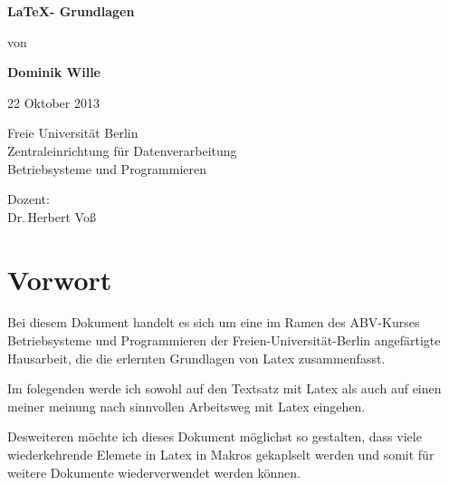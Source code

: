 

\newcommand{\myPackage}[1]{%
  \textit{#1}-Paket%
}

\newcommand{\myFormat}[1]{%
  \textit{#1}%
}

\newcommand{\myPath}[1]{%
  \textit{#1}%
}

\newcommand{\myTitle}{\LaTeX - Grundlagen}
\newcommand{\myAuthor}{Dominik Wille}
\newcommand{\myDate}{22 Oktober 2013}


\begin{titlepage}
  \begin{center}
    \vspace{5cm}
    \huge\bfseries
    \myTitle
    \vspace{1cm}

    \large\normalfont von

    \bigskip
    \textbf{\myAuthor}

    \myDate

    \vspace{2cm}
  \end{center}
  \vfill
  \enlargethispage{2cm}
  \parbox[t]{0.45\textwidth}{%
    Freie Universität Berlin\\
    Zentraleinrichtung für Datenverarbeitung\\
    Betriebsysteme und Programmieren
  }
  \parbox[t]{0.45\textwidth}{\raggedleft%
    Dozent: \\
    Dr.\,Herbert Voß\\
  }
\end{titlepage}
\section{Vorwort}
Bei diesem Dokument handelt es sich um eine im Ramen des ABV-Kurses Betriebsysteme und Programmieren der
Freien-Universität-Berlin angefärtigte Hausarbeit, die die erlernten Grundlagen von Latex zusammenfasst.

Im folegenden werde ich sowohl auf den Textsatz mit Latex als auch auf einen meiner meinung nach sinnvollen
Arbeitsweg mit Latex eingehen.

Desweiteren möchte ich dieses Dokument möglichst so gestalten, dass viele wiederkehrende Elemete in Latex in
Makros gekaplselt werden und somit für weitere Dokumente wiederverwendet werden können.

